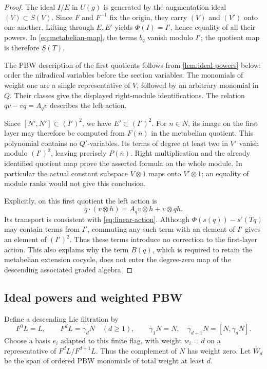 \begin{proof}
The ideal \(I/E\) in \(U(g)\) is generated by the augmentation
ideal \((V)\subset S(V)\). Since \(F\) and \(F^{-1}\) fix the origin,
they carry \((V)\) and \((V')\) onto one another.
Lifting through \(E,E'\) yields \(\Phi(I)=I'\), hence equality of all
their powers. In \eqref{eq:metabelian-map}, the terms \(b_q\)
vanish modulo \(I'\); the quotient map is therefore \(S(T)\).

The PBW description of the first quotients follows from
\cref{lem:ideal-powers} below: order the nilradical variables before
the section variables. The monomials of weight one are a single
representative of \(V\), followed by an arbitrary monomial in \(Q\).
Their classes give the displayed right-module identifications.
The relation \(qv-vq=A_qv\) describes the left action.

Since \([N',N']\subset(I')^2\), we have \(E'\subset(I')^2\).
For \(n\in N\), its image on the first layer may therefore be computed
from \(F(\bar n)\) in the metabelian quotient. This polynomial contains
no \(Q'\)-variables. Its terms of degree at least two in \(V'\) vanish
modulo \((I')^2\), leaving precisely \(P(\bar n)\).
Right multiplication and the already identified quotient map prove
the asserted formula on the whole module. In particular the actual
constant subspace \(V\otimes1\) maps onto \(V'\otimes1\);
an equality of module ranks would not give this conclusion.

Explicitly, on this first quotient the left action is
\[
 q\cdot(v\otimes h)=A_qv\otimes h+v\otimes qh.
\]
Its transport is consistent with \eqref{eq:linear-action}.
Although \(\Phi(s(q))-s'(Tq)\) may contain terms from \(I'\),
commuting any such term with an element of \(I'\) gives an element
of \((I')^2\). Thus these terms introduce no correction to the
first-layer action. This also explains why the term \(B(q)\),
which is required to retain the metabelian extension cocycle,
does not enter the degree-zero map of the descending associated
graded algebra.
\end{proof}

\subsection{Ideal powers and weighted PBW}

Define a descending Lie filtration by
\[
 F^0L=L,\qquad F^dL=\gamma_dN\quad(d\geq1),\qquad
 \gamma_1N=N,\quad \gamma_{d+1}N=[N,\gamma_dN].
\]
Choose a basis \(e_i\) adapted to this finite flag, with weight \(w_i=d\)
on a representative of \(F^dL/F^{d+1}L\). Thus the complement of \(N\)
has weight zero. Let \(W_d\) be the span of ordered PBW monomials
of total weight at least \(d\).

